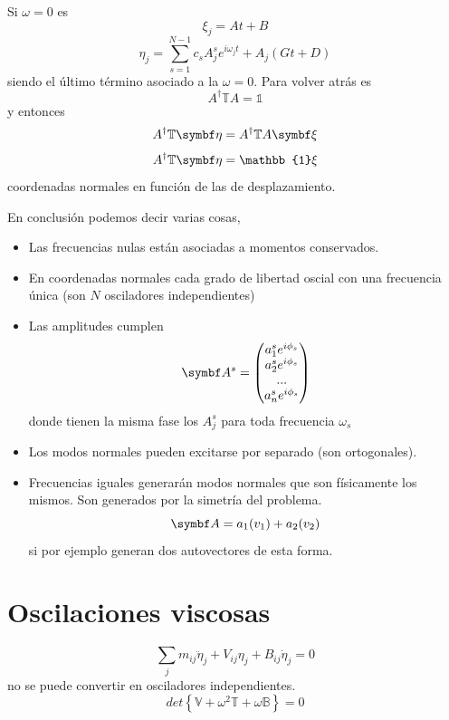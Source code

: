 \documentclass[10pt,oneside]{CBFT_book}
\begin{document}
Si $\omega=0$ es 
\[
	\xi_j = At + B 
\]
\[
	\eta_j = \sum_{s=1}^{N-1} c_s A_j^s e^{i \omega_j t} + A_j(Gt + D)
\]
siendo el último término asociado a la $\omega=0$.
Para volver atrás es 
\[
	A^{\dagger} \mathbb{T} A = \mathbb{1}
\]
y entonces 
\[
	A^{\dagger} \mathbb{T} \vb{\eta} = A^{\dagger} \mathbb{T} A \vb{\xi}  
\]
\[
	A^{\dagger} \mathbb{T} \vb{\eta} = \mathbb{1} \xi
\]
coordenadas normales en función de las de desplazamiento.

En conclusión podemos decir varias cosas,
\begin{itemize}
 \item Las frecuencias nulas están asociadas a momentos conservados.
 \item En coordenadas normales cada grado de libertad oscial con una frecuencia única (son $N$
	osciladores independientes)
 \item Las amplitudes cumplen
 \[ \vb{A}^s =
 \begin{pmatrix}
  a_1^s e^{i \phi_s} \\
  a_2^s e^{i \phi_s} \\
  ... \\
  a_n^s e^{i \phi_s}
 \end{pmatrix}
 \]
 donde tienen la misma fase los $A_j^s$ para toda frecuencia $\omega_s$
 \item Los modos normales pueden excitarse por separado (son ortogonales).
 \item Frecuencias iguales generarán modos normales que son físicamente los
 mismos. Son generados por la simetría del problema.
 \[
	\vb{A} = a_1(v_1) + a_2(v_2)
 \]
 si por ejemplo generan dos autovectores de esta forma.
\end{itemize}


\section{Oscilaciones viscosas}

\[
	\sum_j m_{ij} \ddot{\eta}_j + V_{ij}\eta_j + B_{ij}\dot{\eta}_j = 0
\]
no se puede convertir en osciladores independientes.
\[
	det\left\{ \mathbb{V} + \omega^2 \mathbb{T} + \omega \mathbb{B}\right\} = 0
\]






\end{document}
